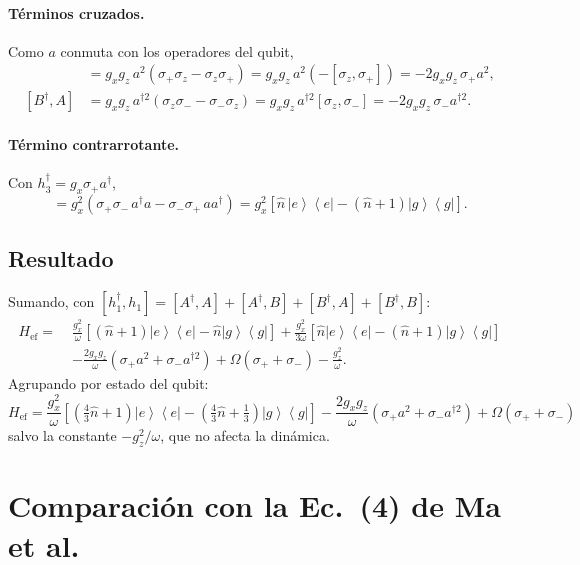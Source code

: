 \documentclass[11pt]{report}
\newcommand{\ket}[1]{\left|#1\right\rangle}
\newcommand{\bra}[1]{\left\langle#1\right|}
\newcommand{\spl}{\sigma_{+}}
\newcommand{\smi}{\sigma_{-}}
\newcommand{\Pe}{\ket{e}\!\bra{e}}
\newcommand{\Pg}{\ket{g}\!\bra{g}}
\begin{document}
\paragraph{T\'erminos cruzados.} Como $a$ conmuta con los operadores del qubit,
\begin{align}
[A^{\dagger},B] &= g_{x}g_{z}\,a^{2}\left(\spl\sigma_{z}-\sigma_{z}\spl\right) = g_{x}g_{z}\,a^{2}\left(-[\sigma_{z},\spl]\right) = -2g_{x}g_{z}\,\spl a^{2},\\
[B^{\dagger},A] &= g_{x}g_{z}\,a^{\dagger 2}\left(\sigma_{z}\smi-\smi\sigma_{z}\right) = g_{x}g_{z}\,a^{\dagger 2}[\sigma_{z},\smi] = -2g_{x}g_{z}\,\smi a^{\dagger 2}.
\end{align}

\paragraph{T\'ermino contrarrotante.} Con $h_{3}^{\dagger}=g_{x}\spl a^{\dagger}$,
\begin{equation}
[h_{3}^{\dagger},h_{3}] = g_{x}^{2}\left(\spl\smi\,a^{\dagger}a - \smi\spl\,a a^{\dagger}\right) = g_{x}^{2}\left[\hat n\,\Pe - (\hat n+1)\Pg\right].
\end{equation}

\subsection{Resultado}

Sumando, con $[h_{1}^{\dagger},h_{1}]=[A^{\dagger},A]+[A^{\dagger},B]+[B^{\dagger},A]+[B^{\dagger},B]$:
\begin{align}
H_{\mathrm{ef}} =\;& \frac{g_{x}^{2}}{\omega}\left[(\hat n+1)\Pe-\hat n\Pg\right] + \frac{g_{x}^{2}}{3\omega}\left[\hat n\Pe-(\hat n+1)\Pg\right]\nonumber\\
&-\frac{2g_{x}g_{z}}{\omega}\left(\spl a^{2}+\smi a^{\dagger 2}\right) + \Omega(\spl+\smi) - \frac{g_{z}^{2}}{\omega}.
\end{align}
Agrupando por estado del qubit:
\begin{equation}
\boxed{
H_{\mathrm{ef}} = \frac{g_{x}^{2}}{\omega}\left[\left(\tfrac{4}{3}\hat n+1\right)\Pe - \left(\tfrac{4}{3}\hat n+\tfrac{1}{3}\right)\Pg\right] - \frac{2g_{x}g_{z}}{\omega}\left(\spl a^{2}+\smi a^{\dagger 2}\right) + \Omega(\spl+\smi)}
\label{eq:Hef}
\end{equation}
salvo la constante $-g_{z}^{2}/\omega$, que no afecta la din\'amica.

\section{Comparaci\'on con la Ec.~(4) de Ma et al.}
\end{document}
